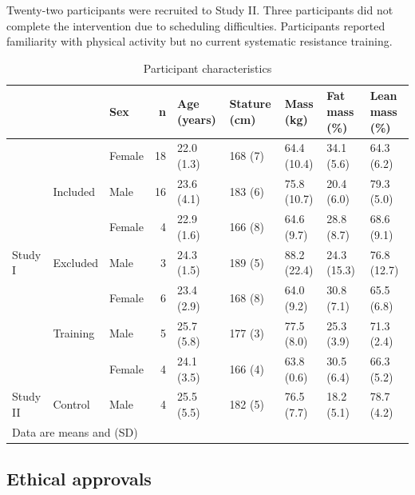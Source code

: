 \documentclass[twoside,10pt]{gihclass} %
\begin{document}
Twenty-two participants were recruited to Study II. Three participants did not complete the intervention due to scheduling difficulties. Participants reported familiarity with physical activity but no current systematic resistance training.
\begin{landscape}\begin{table}

\caption{\label{tab:characteristics-table}Participant characteristics}
\centering
\fontsize{7}{9}\selectfont
\begin{tabular}[t]{lllrlllll}
\toprule
  &   & Sex & n & Age (years) & Stature
(cm) & Mass (kg) & Fat mass (\%) & Lean mass (\%)\\
\midrule
 &  & Female & 18 & 22.0 (1.3) & 168 (7) & 64.4 (10.4) & 34.1 (5.6) & 64.3 (6.2)\\
\cmidrule{3-9}
 & \multirow{-2}{*}{\raggedright\arraybackslash Included} & Male & 16 & 23.6 (4.1) & 183 (6) & 75.8 (10.7) & 20.4 (6.0) & 79.3 (5.0)\\
\cmidrule{2-9}
 &  & Female & 4 & 22.9 (1.6) & 166 (8) & 64.6 (9.7) & 28.8 (8.7) & 68.6 (9.1)\\
\cmidrule{3-9}
\multirow{-4}{*}{\raggedright\arraybackslash Study I} & \multirow{-2}{*}{\raggedright\arraybackslash Excluded} & Male & 3 & 24.3 (1.5) & 189 (5) & 88.2 (22.4) & 24.3 (15.3) & 76.8 (12.7)\\
\cmidrule{1-9}
 &  & Female & 6 & 23.4 (2.9) & 168 (8) & 64.0 (9.2) & 30.8 (7.1) & 65.5 (6.8)\\
\cmidrule{3-9}
 & \multirow{-2}{*}{\raggedright\arraybackslash Training} & Male & 5 & 25.7 (5.8) & 177 (3) & 77.5 (8.0) & 25.3 (3.9) & 71.3 (2.4)\\
\cmidrule{2-9}
 &  & Female & 4 & 24.1 (3.5) & 166 (4) & 63.8 (0.6) & 30.5 (6.4) & 66.3 (5.2)\\
\cmidrule{3-9}
\multirow{-4}{*}{\raggedright\arraybackslash Study II} & \multirow{-2}{*}{\raggedright\arraybackslash Control} & Male & 4 & 25.5 (5.5) & 182 (5) & 76.5 (7.7) & 18.2 (5.1) & 78.7 (4.2)\\
\bottomrule
\multicolumn{9}{l}{\rule{0pt}{1em}Data are means and (SD)}\\
\end{tabular}
\end{table}
\end{landscape}
\hypertarget{ethical-approvals}{%
\subsection{Ethical approvals}\label{ethical-approvals}}
\end{document}
